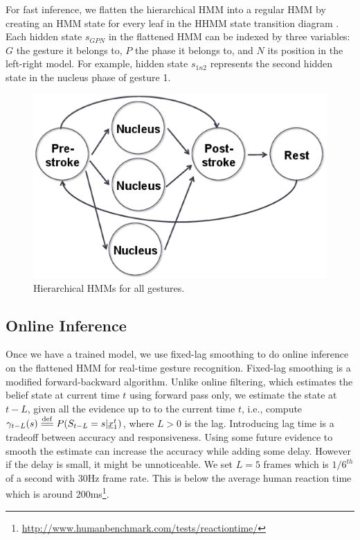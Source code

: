 \documentclass[conference]{IEEEtran}
\newcommand{\eqdef}{\overset{\mathrm{def}}{=\joinrel=}}
\begin{document}
For fast inference, we
flatten the hierarchical HMM into a regular HMM by creating an HMM state for
every leaf in the HHMM state transition diagram \cite{murphy02}. Each
hidden state $s_{GPN}$ in the flattened HMM can be indexed by three variables:
$G$ the gesture it belongs to, $P$ the phase it belongs to, and $N$ its position
in the left-right model. For example, hidden state $s_{1n2}$ represents the
second hidden state in the nucleus phase of gesture 1.

\begin{figure}[t]
\centering
\includegraphics[width=\columnwidth]{fig/combined.ps}
\caption{Hierarchical HMMs for all gestures.}
\label{fig:combined}
\end{figure}

\subsection{Online Inference}
Once we have a trained model, we use fixed-lag smoothing \cite{murphy02} to do
online inference on the flattened HMM for real-time gesture recognition.
Fixed-lag smoothing is a modified forward-backward algorithm. Unlike online
filtering, which estimates the belief state at current time $t$ using forward
pass only, we estimate the state at $t - L$, given all the evidence up to to the
current time $t$, i.e., compute $\gamma_{t - L}(s) \eqdef P(S_{t -
L} = s|\underline{x}_1^t)$, where $L>0$ is the lag. Introducing lag time is a
tradeoff between accuracy and responsiveness. Using some future evidence to
smooth the estimate can increase the accuracy while adding some delay. However
if the delay is small, it might be unnoticeable. We set $L=5$ frames which
is $1/6^{th}$ of a second with 30Hz frame rate. This is below the average human
reaction time which is around
200ms\footnote{\url{http://www.humanbenchmark.com/tests/reactiontime/}}.
\end{document}
